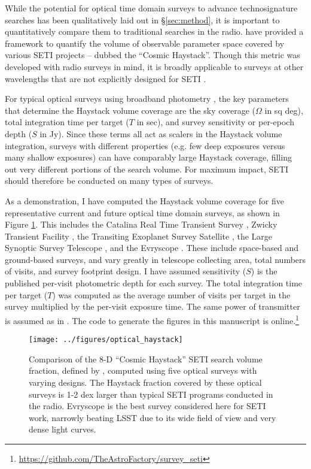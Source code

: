\documentclass[twocolumn]{aastex62}
\newcommand{\TESS}{\textsl{TESS}\xspace}
\begin{document}
While the potential for optical time domain surveys to advance technosignature searches has been qualitatively laid out in \S\ref{sec:method}, it is important to quantitatively compare them to traditional searches in the radio. 
\citet{wright2018c} have provided a framework to quantify the volume of observable parameter space covered by various SETI projects -- dubbed the ``Cosmic Haystack''. Though this metric was developed with radio surveys in mind, it is broadly applicable to surveys at other wavelengths that are not explicitly designed for SETI \citep[e.g. see][]{forgan2019}.

For typical optical surveys using broadband photometry \citep{djorgovski2013}, the key parameters that determine the Haystack volume coverage are the sky coverage ($\Omega$ in sq deg), total integration time per target ($T$ in sec), and survey sensitivity or per-epoch depth ($S$ in Jy).
Since these terms all act as scalers in the Haystack volume integration, surveys with different properties (e.g. few deep exposures versus many shallow exposures) can have comparably large Haystack coverage, filling out very different portions of the search volume. For maximum impact, SETI should therefore be conducted on many types of surveys.


As a demonstration, I have computed the Haystack volume coverage for five representative current and future optical time domain surveys, as shown in Figure \ref{fig:hay}. This includes the Catalina Real Time Transient Survey \citep[CRTS;][]{catalina}, Zwicky Transient Facility \citep[ZTF;][]{bellm2014}, the Transiting Exoplanet Survey Satellite \citep[\TESS;][]{tess}, the Large Synoptic Survey Telescope \citep[LSST;][]{lsst}, and the Evryscope \citep{law2015}. These include space-based and ground-based surveys, and vary greatly in telescope collecting area, total numbers of visits, and survey footprint design. 
I have assumed sensitivity ($S$) is the published per-visit photometric depth for each survey. The total integration time per target ($T$) was computed as the average number of visits per target in the survey multiplied by the per-visit exposure time. The same power of transmitter is assumed as in \citet{wright2018c}. 
The code to generate the figures in this manuscript is online.\footnote{\url{https://github.com/TheAstroFactory/survey_seti}}


\begin{figure}[]
\centering
\texttt{[image: ../figures/optical\_haystack]}
\caption{
Comparison of the 8-D ``Cosmic Haystack'' SETI search volume fraction, defined by \citet{wright2018c}, computed using five optical surveys with varying designs. The Haystack fraction covered by these optical surveys is 1-2 dex larger than typical SETI programs conducted in the radio.
Evryscope \citet{law2015} is the best survey considered here for SETI work, narrowly beating LSST due to its wide field of view and very dense light curves.}
\label{fig:hay}
\end{figure}
\end{document}
